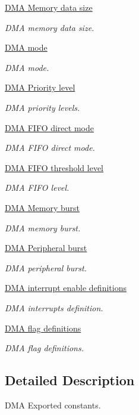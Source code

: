 \begin{DoxyCompactItemize}
\hyperlink{group___d_m_a___memory__data__size}{D\+M\+A Memory data size}
\begin{DoxyCompactList}\small\item\em D\+MA memory data size. \end{DoxyCompactList}\item 
\hyperlink{group___d_m_a__mode}{D\+M\+A mode}
\begin{DoxyCompactList}\small\item\em D\+MA mode. \end{DoxyCompactList}\item 
\hyperlink{group___d_m_a___priority__level}{D\+M\+A Priority level}
\begin{DoxyCompactList}\small\item\em D\+MA priority levels. \end{DoxyCompactList}\item 
\hyperlink{group___d_m_a___f_i_f_o__direct__mode}{D\+M\+A F\+I\+F\+O direct mode}
\begin{DoxyCompactList}\small\item\em D\+MA F\+I\+FO direct mode. \end{DoxyCompactList}\item 
\hyperlink{group___d_m_a___f_i_f_o__threshold__level}{D\+M\+A F\+I\+F\+O threshold level}
\begin{DoxyCompactList}\small\item\em D\+MA F\+I\+FO level. \end{DoxyCompactList}\item 
\hyperlink{group___d_m_a___memory__burst}{D\+M\+A Memory burst}
\begin{DoxyCompactList}\small\item\em D\+MA memory burst. \end{DoxyCompactList}\item 
\hyperlink{group___d_m_a___peripheral__burst}{D\+M\+A Peripheral burst}
\begin{DoxyCompactList}\small\item\em D\+MA peripheral burst. \end{DoxyCompactList}\item 
\hyperlink{group___d_m_a__interrupt__enable__definitions}{D\+M\+A interrupt enable definitions}
\begin{DoxyCompactList}\small\item\em D\+MA interrupts definition. \end{DoxyCompactList}\item 
\hyperlink{group___d_m_a__flag__definitions}{D\+M\+A flag definitions}
\begin{DoxyCompactList}\small\item\em D\+MA flag definitions. \end{DoxyCompactList}\end{DoxyCompactItemize}


\subsection{Detailed Description}
D\+MA Exported constants. 

